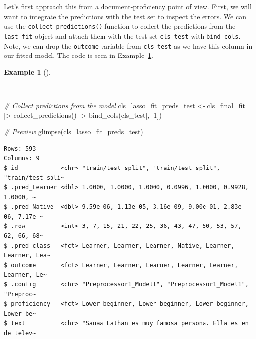 \documentclass[
  letterpaper,
]{book}
\newenvironment{Shaded}{\begin{snugshade}}{\end{snugshade}}
\newcommand{\CommentTok}[1]{\textcolor[rgb]{0.00,0.00,0.00}{\textit{#1}}}
\newcommand{\DecValTok}[1]{\textcolor[rgb]{0.00,0.00,0.00}{#1}}
\newcommand{\FunctionTok}[1]{\textcolor[rgb]{0.00,0.00,0.00}{#1}}
\newcommand{\NormalTok}[1]{\textcolor[rgb]{0.00,0.00,0.00}{#1}}
\newcommand{\OtherTok}[1]{\textcolor[rgb]{0.00,0.00,0.00}{#1}}
\newcommand{\SpecialCharTok}[1]{\textcolor[rgb]{0.00,0.00,0.00}{#1}}
\theoremstyle{definition}
\newtheorem{example}{Example}[chapter]
\theoremstyle{remark}
\begin{document}
Let's first approach this from a document-proficiency point of view.
First, we will want to integrate the predictions with the test set to
inspect the errors. We can use the \texttt{collect\_predictions()}
function to collect the predictions from the \texttt{last\_fit} object
and attach them with the test set \texttt{cls\_test} with
\texttt{bind\_cols}. Note, we can drop the \texttt{outcome} variable
from \texttt{cls\_test} as we have this column in our fitted model. The
code is seen in
Example~\ref{exm-predict-class-tune-hyperparameters-integrate-test}.

\begin{example}[]\protect\hypertarget{exm-predict-class-tune-hyperparameters-integrate-test}{}\label{exm-predict-class-tune-hyperparameters-integrate-test}

~

\begin{Shaded}
\begin{Highlighting}[]
\CommentTok{\# Collect predictions from the model}
\NormalTok{cls\_lasso\_fit\_preds\_test }\OtherTok{\textless{}{-}}
\NormalTok{  cls\_final\_fit }\SpecialCharTok{|\textgreater{}}
  \FunctionTok{collect\_predictions}\NormalTok{() }\SpecialCharTok{|\textgreater{}}
  \FunctionTok{bind\_cols}\NormalTok{(cls\_test[, }\SpecialCharTok{{-}}\DecValTok{1}\NormalTok{])}

\CommentTok{\# Preview}
\FunctionTok{glimpse}\NormalTok{(cls\_lasso\_fit\_preds\_test)}
\end{Highlighting}
\end{Shaded}

\begin{verbatim}
Rows: 593
Columns: 9
$ id            <chr> "train/test split", "train/test split", "train/test spli~
$ .pred_Learner <dbl> 1.0000, 1.0000, 1.0000, 0.0996, 1.0000, 0.9928, 1.0000, ~
$ .pred_Native  <dbl> 9.59e-06, 1.13e-05, 3.16e-09, 9.00e-01, 2.83e-06, 7.17e-~
$ .row          <int> 3, 7, 15, 21, 22, 25, 36, 43, 47, 50, 53, 57, 62, 66, 68~
$ .pred_class   <fct> Learner, Learner, Learner, Native, Learner, Learner, Lea~
$ outcome       <fct> Learner, Learner, Learner, Learner, Learner, Learner, Le~
$ .config       <chr> "Preprocessor1_Model1", "Preprocessor1_Model1", "Preproc~
$ proficiency   <fct> Lower beginner, Lower beginner, Lower beginner, Lower be~
$ text          <chr> "Sanaa Lathan es muy famosa persona. Ella es en de telev~
\end{verbatim}

\end{example}
\end{document}
